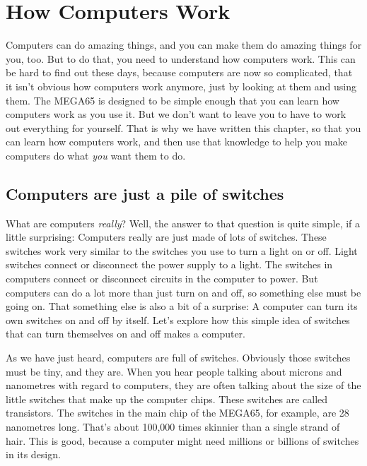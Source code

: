 \chapter{How Computers Work}

Computers can do amazing things, and you can make them do amazing things for you, too.
But to do that, you need to understand how computers work.  This can be hard to find
out these days, because computers are now so complicated, that it isn't obvious how
computers work anymore, just by looking at them and using them.  The MEGA65 is designed
to be simple enough that you can learn how computers work as you use it.  But we don't
want to leave you to have to work out everything for yourself.  That is why we have
written this chapter, so that you can learn how computers work, and then use that knowledge
to help you make computers do what \emph{you} want them to do.

\section{Computers are just a pile of switches}

What are computers \emph{really}? Well, the answer to that question is quite simple, if a little
surprising: Computers really are just made of lots of switches.  These switches work very similar
to the switches you use to turn a light on or off.  Light switches connect or disconnect the
power supply to a light.  The switches in computers connect or disconnect circuits in the computer
to power. But computers can do a lot more than just turn on and off, so something else must be
going on. That something else is also a bit of a surprise: A computer can turn its own switches
on and off by itself.  Let's explore how this simple idea of switches that can turn themselves on
and off makes a computer.

As we have just heard, computers are full of switches.  Obviously those switches must be tiny, and they
are.  When you hear people talking about microns and nanometres with regard to computers, they are often
talking about the size of the little switches that make up the computer chips.  These switches are called
transistors. The switches in the main
chip of the MEGA65, for example, are 28 nanometres long.  That's about 100,000 times skinnier than a single
strand of hair.  This is good, because a computer might need millions or billions of switches in its design.

